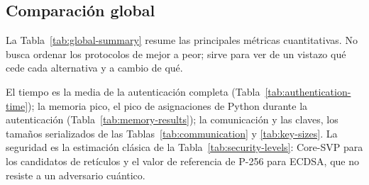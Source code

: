 \subsection{Comparación global}
\label{sec:global-comparison}

La Tabla~\ref{tab:global-summary} resume las principales métricas cuantitativas.
No busca ordenar los protocolos de mejor a peor; sirve para ver de un vistazo qué cede cada alternativa y a cambio de qué.

\begin{table}[H]
\centering
\caption{Resumen cuantitativo de los resultados principales.}
\label{tab:global-summary}
\end{table}

El tiempo es la media de la autenticación completa (Tabla~\ref{tab:authentication-time}); la memoria pico, el pico de asignaciones de Python durante la autenticación (Tabla~\ref{tab:memory-results}); la comunicación y las claves, los tamaños serializados de las Tablas~\ref{tab:communication} y \ref{tab:key-sizes}. La seguridad es la estimación clásica de la Tabla~\ref{tab:security-levels}: Core-SVP para los candidatos de retículos y el valor de referencia de P-256 para ECDSA, que no resiste a un adversario cuántico.


